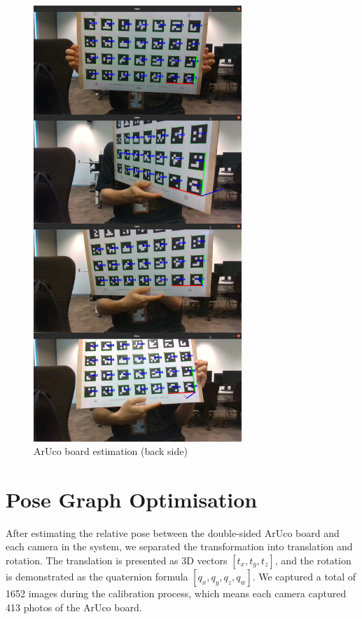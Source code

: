 \begin{figure}[ht]
\centering
\includegraphics[width=0.7\textwidth]{Images/Board detection (back).jpg}
\caption{ArUco board estimation (back side)}
\end{figure}

\clearpage
\section{Pose Graph Optimisation}
After estimating the relative pose between the double-sided ArUco board and each camera in the system, we separated the transformation into translation and rotation. The translation is presented as 3D vectors $[t_{x}, t_{y}, t_{z}]$, and the rotation is demonstrated as the quaternion formula $[q_{x}, q_{y}, q_{z}, q_{w}]$. We captured a total of 1652 images during the calibration process, which means each camera captured 413 photos of the ArUco board.

